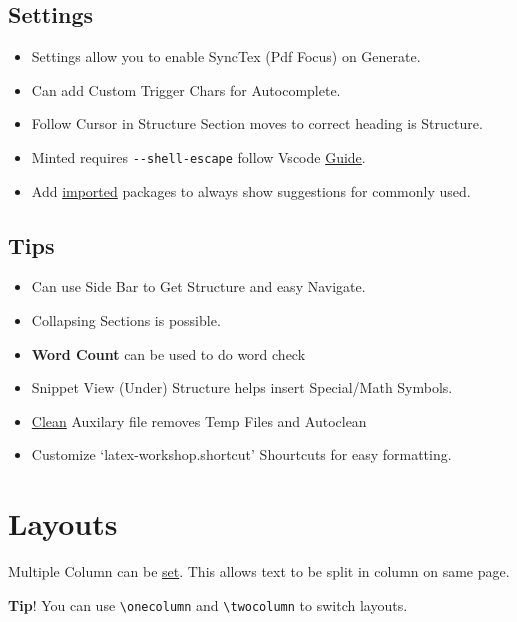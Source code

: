 \documentclass{report}[a4paper,12pt] %
\begin{document}
\subsection{Settings}
\begin{itemize}
  \item Settings allow you to enable SyncTex (Pdf Focus) on Generate.
  \item Can add Custom Trigger Chars for Autocomplete.
  \item Follow Cursor in Structure Section moves to correct heading is Structure.
  \item Minted requires \verb|--shell-escape| follow Vscode \href{https://leportella.com/minted-vscode/}{Guide}.
  \item Add \href{https://www.reddit.com/r/LaTeX/comments/pwkopy/subfile_autocompletion_in_vs_code/}{imported} packages to always show suggestions for commonly used.
\end{itemize}

\subsection{Tips}
\begin{itemize}
  \item Can use Side Bar to Get Structure and easy Navigate.
  \item Collapsing Sections is possible.
  \item \textbf{Word Count} can be used to do word check
  \item Snippet View (Under) Structure helps insert Special/Math Symbols.
  \item \href{https://github.com/James-Yu/LaTeX-Workshop/wiki/Compile#cleaning-generated-files}{Clean} Auxilary file removes Temp Files and Autoclean
  \item Customize `latex-workshop.shortcut' Shourtcuts for easy formatting.
\end{itemize}

\section{Layouts}
Multiple Column can be \href{https://www.overleaf.com/learn/latex/Multiple_columns}{set}. This allows text to be split in column on same page.

\begin{tcolorbox}
  \textbf{Tip}! You can use \verb|\onecolumn| and \verb|\twocolumn| to switch layouts.
\end{tcolorbox}
\end{document}
